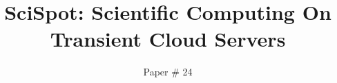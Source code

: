 \documentclass[sigconf, 10pt]{acmart} %
\begin{document}
\title{SciSpot: Scientific Computing On Transient Cloud Servers}
\author{Paper \# 24}{}{}

\begin{abstract}
  
\end{abstract}

\maketitle






%





%










{


%
}
\end{document}
